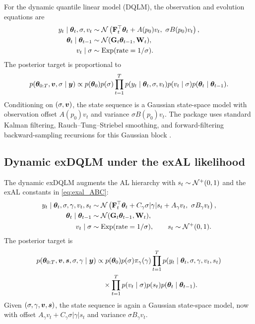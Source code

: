 For the dynamic quantile linear model (DQLM), the observation and evolution
equations are
\begin{align}
y_t\mid\boldsymbol{\theta}_t,\sigma,v_t
&\sim
\mathcal{N}\left(\mathbf{F}_t^\top\boldsymbol{\theta}_t+A(p_0)v_t,\
\sigma B(p_0)v_t\right),\\
\boldsymbol{\theta}_t\mid\boldsymbol{\theta}_{t-1}
&\sim \mathcal{N}(\mathbf{G}_t\boldsymbol{\theta}_{t-1},\mathbf{W}_t),\\
v_t\mid\sigma &\sim \operatorname{Exp}(\text{rate}=1/\sigma).
\label{eq:dyn_dqlm_hierarchy}
\end{align}
The posterior target is proportional to
\begin{equation}
p(\boldsymbol{\theta}_{0:T},\boldsymbol{v},\sigma\mid\boldsymbol{y})
\propto
p(\boldsymbol{\theta}_0)p(\sigma)
\prod_{t=1}^T
p(y_t\mid\boldsymbol{\theta}_t,\sigma,v_t)
p(v_t\mid\sigma)
p(\boldsymbol{\theta}_t\mid\boldsymbol{\theta}_{t-1}).
\label{eq:dyn_dqlm_joint}
\end{equation}
Conditioning on $(\sigma,\boldsymbol{v})$, the state sequence is a Gaussian
state-space model with observation offset $A(p_0)v_t$ and variance
$\sigma B(p_0)v_t$. The package uses standard Kalman filtering,
Rauch--Tung--Striebel smoothing, and forward-filtering backward-sampling
recursions for this Gaussian block \citep{west1997bayesian}.
\label{sec:gaussian_state_update}

\subsection{Dynamic exDQLM under the exAL likelihood}
\label{sec:dyn_exdqlm}

The dynamic exDQLM augments the AL hierarchy with $s_t\sim\mathcal{N}^{+}(0,1)$ and
the exAL constants in \eqref{eq:exal_ABC}:
\begin{align}
y_t\mid\boldsymbol{\theta}_t,\sigma,\gamma,v_t,s_t
&\sim
\mathcal{N}\left(
\mathbf{F}_t^\top\boldsymbol{\theta}_t
+C_\gamma\sigma|\gamma|s_t+A_\gamma v_t,\
\sigma B_\gamma v_t
\right),\\
\boldsymbol{\theta}_t\mid\boldsymbol{\theta}_{t-1}
&\sim \mathcal{N}(\mathbf{G}_t\boldsymbol{\theta}_{t-1},\mathbf{W}_t),\\
v_t\mid\sigma&\sim\operatorname{Exp}(\text{rate}=1/\sigma),\qquad
s_t\sim\mathcal{N}^{+}(0,1).
\label{eq:dyn_exdqlm_obs}
\end{align}
The posterior target is
\begin{align}
p(\boldsymbol{\theta}_{0:T},\boldsymbol{v},\boldsymbol{s},\sigma,\gamma\mid\boldsymbol{y})
&\propto
p(\boldsymbol{\theta}_0)p(\sigma)\pi_\gamma(\gamma)
\prod_{t=1}^T p(y_t\mid\boldsymbol{\theta}_t,\sigma,\gamma,v_t,s_t)
\nonumber\\
&\quad{}\times
\prod_{t=1}^T
p(v_t\mid\sigma)p(s_t)
p(\boldsymbol{\theta}_t\mid\boldsymbol{\theta}_{t-1}).
\label{eq:dyn_exdqlm_joint}
\end{align}
Given $(\sigma,\gamma,\boldsymbol{v},\boldsymbol{s})$, the state sequence is again a
Gaussian state-space model, now with offset
$A_\gamma v_t+C_\gamma\sigma|\gamma|s_t$ and variance
$\sigma B_\gamma v_t$.

